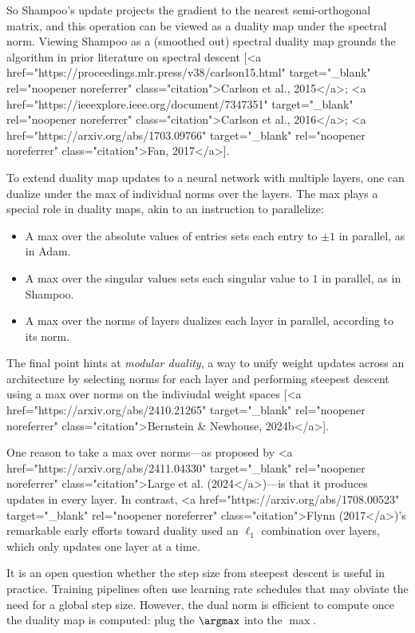 So Shampoo's update projects the gradient to the nearest semi-orthogonal matrix, and this operation can be viewed as a duality map under the spectral norm. Viewing Shampoo as a (smoothed out) spectral duality map grounds the algorithm in prior literature on spectral descent [<a href="https://proceedings.mlr.press/v38/carlson15.html" target="_blank" rel="noopener noreferrer" class="citation">Carlson et al., 2015</a>; <a href="https://ieeexplore.ieee.org/document/7347351" target="_blank" rel="noopener noreferrer" class="citation">Carlson et al., 2016</a>; <a href="https://arxiv.org/abs/1703.09766" target="_blank" rel="noopener noreferrer" class="citation">Fan, 2017</a>].

To extend duality map updates to a neural network with multiple layers, one can dualize under the max of individual norms over the layers. The max plays a special role in duality maps, akin to an instruction to parallelize:

\begin{itemize}
    \item A max over the absolute values of entries sets each entry to $\pm 1$ in parallel, as in Adam.
    \item A max over the singular values sets each singular value to $1$ in parallel, as in Shampoo.
    \item A max over the norms of layers dualizes each layer in parallel, according to its norm.
\end{itemize}

The final point hints at \textit{modular duality}, a way to unify weight updates across an architecture by selecting norms for each layer and performing steepest descent using a max over norms on the indiviudal weight spaces [<a href="https://arxiv.org/abs/2410.21265" target="_blank" rel="noopener noreferrer" class="citation">Bernstein & Newhouse, 2024b</a>].

One reason to take a max over norms---as proposed by <a href="https://arxiv.org/abs/2411.04330" target="_blank" rel="noopener noreferrer" class="citation">Large et al. (2024</a>)---is that it produces updates in every layer. In contrast, <a href="https://arxiv.org/abs/1708.00523" target="_blank" rel="noopener noreferrer" class="citation">Flynn (2017</a>)'s remarkable early efforts toward duality used an $\ell_1$ combination over layers, which only updates one layer at a time.

It is an open question whether the step size from steepest descent is useful in practice. Training pipelines often use learning rate schedules that may obviate the need for a global step size. However, the dual norm is efficient to compute once the duality map is computed: plug the $\argmax$ into the $\max$.

